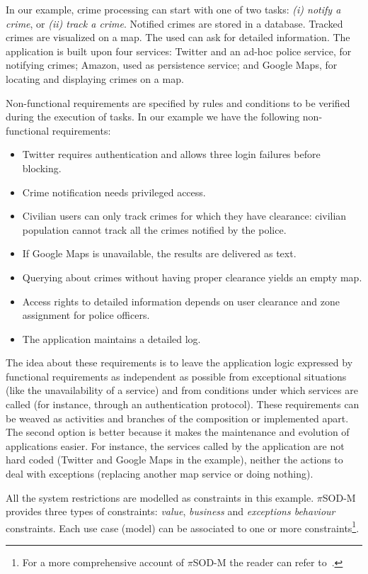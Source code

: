 \documentclass{llncs}
\theoremstyle{plain}
\theoremstyle{plain}
\theoremstyle{plain}
\begin{document}
In our example, crime processing can start with one of two tasks: \textit{(i) notify a crime}, or \textit{(ii) track a crime}.
Notified crimes are stored in a database. 
Tracked crimes are visualized on a map.
The used can ask for detailed information. 
The application is built upon four services: \textsf{Twitter} and an \textsf{ad-hoc police service}, for notifying crimes; \textsf{Amazon}, used as  persistence service; and  \textsf{Google Maps}, for locating and displaying crimes on a map.

Non-functional requirements are specified by rules and conditions to be verified during the execution of tasks.
In our example we have the following non-functional requirements:
\begin{itemize}
\item Twitter requires authentication and allows three login failures before blocking. 
\item Crime notification needs privileged access.
\item Civilian users can only track crimes for which they have clearance: civilian population cannot track all the crimes notified by the police. 
\item If \textsf{Google Maps} is unavailable, the results are delivered as text. 
\item Querying about crimes without having proper clearance yields an empty map.
\item Access rights to detailed information depends on user clearance and zone assignment for police officers. 
\item The application maintains a detailed log. 
\end{itemize}
The idea about these requirements is to leave the application logic expressed by functional requirements as independent as possible from exceptional situations (like the unavailability of a service) and from conditions under which services are called (for instance, through an authentication protocol). These requirements can be  weaved as activities and branches of the composition or implemented apart. The second option is better because it makes the maintenance and evolution of applications easier. For instance, the services called by the application are not hard coded (\textsf{Twitter} and \textsf{Google Maps} in the example), neither the actions to deal with exceptions (replacing another map service or doing nothing).

All the system restrictions are modelled as constraints in this example. 
$\pi$SOD-M provides three types of constraints:
\textit{value}, \textit{business} and \textit{exceptions behaviour} constraints.
Each use case (model) can be associated to one or more constraints\footnote{For a more comprehensive account of $\pi$SOD-M the reader can refer to~\cite{PlacidoThesis2012}.}.
\end{document}
